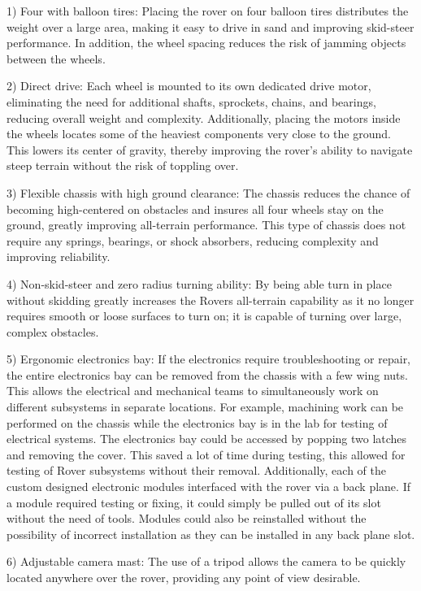 \documentclass[conference]{IEEEtran} %
\begin{document}
1) Four with balloon tires: Placing the rover on four balloon tires distributes the weight over a large area, making it easy to drive in sand and improving skid-steer performance. In addition, the wheel spacing reduces the risk of jamming objects between the wheels. 

2) Direct drive: Each wheel is mounted to its own dedicated drive motor, eliminating the need for additional shafts, sprockets, chains, and bearings, reducing overall weight and complexity. Additionally, placing the motors inside the wheels locates some of the heaviest components very close to the ground. This lowers its center of gravity, thereby improving the rover’s ability to navigate steep terrain without the risk of toppling over. 

3) Flexible chassis with high ground clearance: The chassis reduces the chance of becoming high-centered on obstacles and insures all four wheels stay on the ground, greatly improving all-terrain performance. This type of chassis does not require any springs, bearings, or shock absorbers, reducing complexity and improving reliability. 

4) Non-skid-steer and zero radius turning ability: By being able turn in place without skidding greatly increases the Rovers all-terrain capability as it no longer requires smooth or loose surfaces to turn on; it is capable of turning over large, complex obstacles. 

5) Ergonomic electronics bay: If the electronics require troubleshooting or repair, the entire electronics bay can be removed from the chassis with a few wing nuts. This allows the electrical and mechanical teams to simultaneously work on different subsystems in separate locations. For example, machining work can be performed on the chassis while the electronics bay is in the lab for testing of electrical systems. The electronics bay could be accessed by popping two latches and removing the cover. This saved a lot of time during testing, this allowed for testing of Rover subsystems without their removal. Additionally, each of the custom designed electronic modules interfaced with the rover via a back plane. If a module required testing or fixing, it could simply be pulled out of its slot without the need of tools. Modules could also be reinstalled without the possibility of incorrect installation as they can be installed in any back plane slot. 

6) Adjustable camera mast: The use of a tripod allows the camera to be quickly located anywhere over the rover, providing any point of view desirable. 
\end{document}
